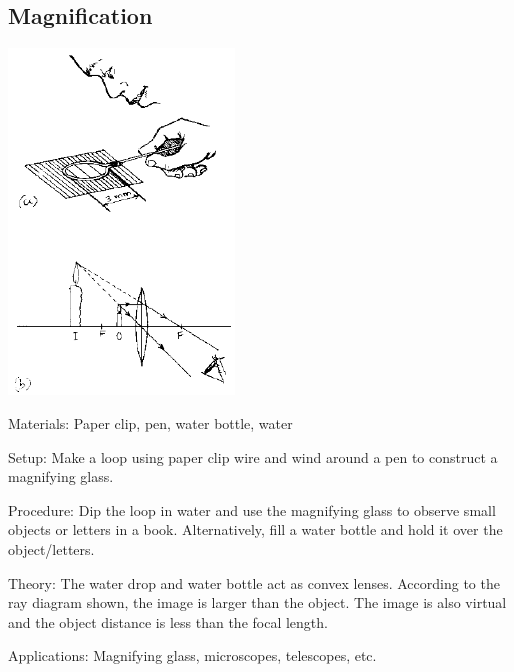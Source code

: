 \begin{multicols}{2}
\subsection{Magnification}

\begin{center}
\includegraphics[width=0.45\textwidth]{./img/source/magnification.png}
\end{center}

\begin{description*}
\item[Materials:]{Paper clip, pen, water bottle, water}
\item[Setup:]{Make a loop using paper clip wire and wind around a pen to construct a magnifying glass.}
\item[Procedure:]{Dip the loop in water and use the magnifying glass to observe small objects or letters in a book. Alternatively, fill a water bottle and hold it over the object/letters.}
\item[Theory:]{The water drop and water bottle act as convex lenses. According to the ray diagram shown, the image is larger than the object. The image is also virtual and the object distance is less than the focal length.}
\item[Applications:]{Magnifying glass, microscopes, telescopes, etc.}
\end{description*}


\end{multicols}
